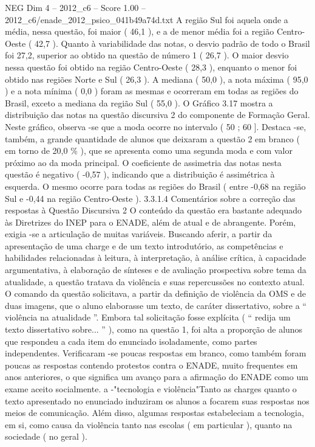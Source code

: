 \begin{textsample}{NEG Dim 4 – 2012\_c6 – Score 1.00 – 2012\_c6/enade\_2012\_psico\_041b49a74d.txt}
A região Sul foi aquela onde a média, nessa questão, foi maior ( 46,1 ), e a de menor média foi a região Centro-Oeste ( 42,7 ).
Quanto à variabilidade das notas, o desvio padrão de todo o Brasil foi 27,2, superior ao obtido na questão de número 1 ( 26,7 ).
O maior desvio nessa questão foi obtido na região Centro-Oeste ( 28,3 ), enquanto o menor foi obtido nas regiões Norte e Sul ( 26,3 ).
A mediana ( 50,0 ), a nota máxima ( 95,0 ) e a nota mínima ( 0,0 ) foram as mesmas e ocorreram em todas as regiões do Brasil, exceto a mediana da região Sul ( 55,0 ).
O Gráfico 3.17 mostra a distribuição das notas na questão discursiva 2 do componente de Formação Geral.
Neste gráfico, observa -se que a moda ocorre no intervalo ( 50 ; 60 ].
Destaca -se, também, a grande quantidade de alunos que deixaram a questão 2 em branco ( em torno de 20,0 \% ), que se apresenta como uma segunda moda e com valor próximo ao da moda principal.
O coeficiente de assimetria das notas nesta questão é negativo ( -0,57 ), indicando que a distribuição é assimétrica à esquerda.
O mesmo ocorre para todas as regiões do Brasil ( entre -0,68 na região Sul e -0,44 na região Centro-Oeste ). 3.3.1.4 Comentários sobre a correção das respostas à Questão Discursiva 2 O conteúdo da questão era bastante adequado às Diretrizes do INEP para o ENADE, além de atual e de abrangente.
Porém, exigia -se a articulação de muitas variáveis.
Buscando aferir, a partir da apresentação de uma charge e de um texto introdutório, as competências e habilidades relacionadas à leitura, à interpretação, à análise crítica, à capacidade argumentativa, à elaboração de sínteses e de avaliação prospectiva sobre tema da atualidade, a questão tratava da violência e suas repercussões no contexto atual.
O comando da questão solicitava, a partir da definição de violência da OMS e de duas imagens, que o aluno elaborasse um texto, de caráter dissertativo, sobre a “ violência na atualidade ”.
Embora tal solicitação fosse explícita ( “ redija um texto dissertativo sobre... ” ), como na questão 1, foi alta a proporção de alunos que respondeu a cada item do enunciado isoladamente, como partes independentes.
Verificaram -se poucas respostas em branco, como também foram poucas as respostas contendo protestos contra o ENADE, muito frequentes em anos anteriores, o que significa um avanço para a afirmação do ENADE como um exame aceito socialmente. a -"tecnologia e violência"Tanto as charges quanto o texto apresentado no enunciado induziram os alunos a focarem suas respostas nos meios de comunicação.
Além disso, algumas respostas estabeleciam a tecnologia, em si, como causa da violência tanto nas escolas ( em particular ), quanto na sociedade ( no geral ).

\end{textsample}

